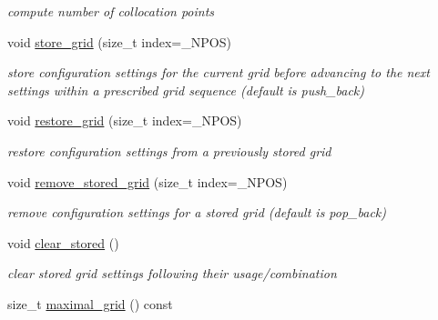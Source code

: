 \begin{DoxyCompactItemize}
\begin{DoxyCompactList}\small\item\em compute number of collocation points \end{DoxyCompactList}\item 
void \hyperlink{classPecos_1_1HierarchSparseGridDriver_aeae6e6d94a2e3e77d612eee151c77799}{store\+\_\+grid} (size\+\_\+t index=\+\_\+\+N\+P\+OS)\label{classPecos_1_1HierarchSparseGridDriver_aeae6e6d94a2e3e77d612eee151c77799}

\begin{DoxyCompactList}\small\item\em store configuration settings for the current grid before advancing to the next settings within a prescribed grid sequence (default is push\+\_\+back) \end{DoxyCompactList}\item 
void \hyperlink{classPecos_1_1HierarchSparseGridDriver_a31ba839ff630bbc25292b448fff38a73}{restore\+\_\+grid} (size\+\_\+t index=\+\_\+\+N\+P\+OS)\label{classPecos_1_1HierarchSparseGridDriver_a31ba839ff630bbc25292b448fff38a73}

\begin{DoxyCompactList}\small\item\em restore configuration settings from a previously stored grid \end{DoxyCompactList}\item 
void \hyperlink{classPecos_1_1HierarchSparseGridDriver_a93215ecdfbc51b7c45998fa4d65fc7fd}{remove\+\_\+stored\+\_\+grid} (size\+\_\+t index=\+\_\+\+N\+P\+OS)\label{classPecos_1_1HierarchSparseGridDriver_a93215ecdfbc51b7c45998fa4d65fc7fd}

\begin{DoxyCompactList}\small\item\em remove configuration settings for a stored grid (default is pop\+\_\+back) \end{DoxyCompactList}\item 
void \hyperlink{classPecos_1_1HierarchSparseGridDriver_ae4337960917eda26a5672e5c6afbb62a}{clear\+\_\+stored} ()\label{classPecos_1_1HierarchSparseGridDriver_ae4337960917eda26a5672e5c6afbb62a}

\begin{DoxyCompactList}\small\item\em clear stored grid settings following their usage/combination \end{DoxyCompactList}\item 
size\+\_\+t \hyperlink{classPecos_1_1HierarchSparseGridDriver_a6edda8aad31eb8a64e180e6a76a6e0e9}{maximal\+\_\+grid} () const \label{classPecos_1_1HierarchSparseGridDriver_a6edda8aad31eb8a64e180e6a76a6e0e9}


\end{DoxyCompactItemize}
